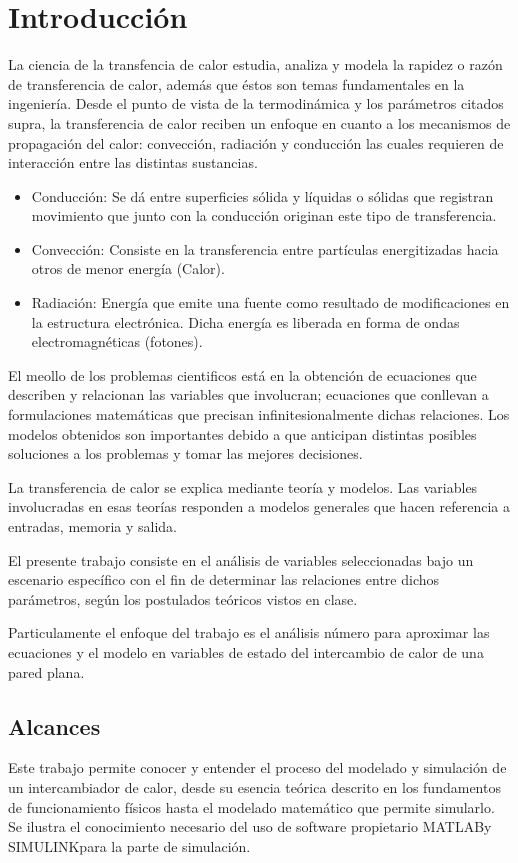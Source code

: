 \documentclass[12pt,letterpaper]{article}     %
\begin{document}
\section{Introducción}  
La ciencia de la transfencia de calor estudia, analiza y modela la rapidez o razón de transferencia de calor, además que éstos son temas fundamentales en la ingeniería.
Desde el punto de vista de la termodinámica y los parámetros citados supra, la transferencia de calor reciben un enfoque en cuanto a los mecanismos de propagación del calor: convección, radiación y conducción las cuales requieren de interacción entre las distintas sustancias.
\begin{itemize}
\item Conducción:
Se dá entre superficies sólida y líquidas o sólidas que registran movimiento que junto con la conducción originan este tipo de transferencia.

\item Convección:
Consiste en la transferencia entre partículas energitizadas hacia otros de menor energía (Calor).


\item Radiación:
Energía que emite una fuente como resultado de modificaciones en la estructura electrónica. Dicha energía es liberada en forma de ondas electromagnéticas (fotones).

\end{itemize}
El meollo de los problemas cientificos está en la obtención de ecuaciones que describen y relacionan las variables que involucran; ecuaciones que conllevan a formulaciones matemáticas que precisan infinitesionalmente dichas relaciones.
Los modelos  obtenidos son importantes debido a que anticipan distintas posibles soluciones a los problemas y tomar las mejores decisiones.

La transferencia de calor se explica mediante teoría y modelos. Las variables involucradas en esas teorías responden a modelos generales que hacen referencia a entradas, memoria y salida.

El presente trabajo consiste en el análisis de variables seleccionadas bajo un escenario específico con el fin de determinar las relaciones entre dichos parámetros, según los postulados teóricos vistos en clase.

Particulamente el enfoque del trabajo es el análisis número para aproximar las ecuaciones y el modelo en variables de estado del intercambio de calor de una pared plana.


\subsection{Alcances}
Este trabajo permite conocer y entender el proceso del modelado y simulación de un intercambiador de calor, desde su esencia teórica descrito en los fundamentos de funcionamiento físicos hasta el modelado matemático que permite simularlo. Se ilustra el conocimiento necesario del uso de software propietario MATLAB\circledR\space  y SIMULINK\circledR\space para la parte de simulación.
\newpage
\newpage
\end{document}
